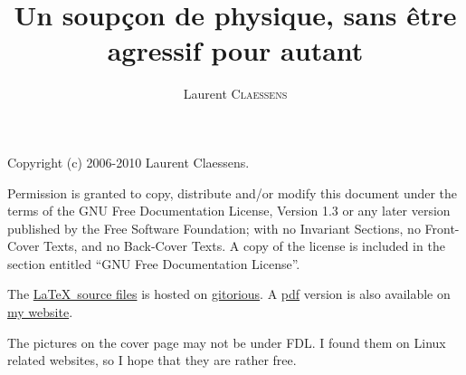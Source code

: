 
\thispagestyle{empty}
\title{Un soupçon de physique, sans être agressif pour autant}
\author{Laurent \textsc{Claessens}}
\maketitle

Copyright (c) 2006-2010  Laurent Claessens.

Permission is granted to copy, distribute and/or modify this document under the terms of the GNU Free Documentation License, Version 1.3 or any later version published by the Free Software Foundation; with no Invariant Sections, no Front-Cover Texts, and no Back-Cover Texts. A copy of the license is included in the section entitled ``GNU Free Documentation License''.

The \href{http://gitorious.org/echa}{\LaTeX\ source files} is hosted on \href{http://fr.wikipedia.org/wiki/Git}{gitorious}. A \href{http://student.ulb.ac.be/~lclaesse/echa.pdf}{pdf} version is also available on \href{http://student.ulb.ac.be/~lclaesse/}{my website}.

\vspace{0.5cm}
The pictures on the cover page may not be under FDL. I found them on Linux related websites, so I hope that they are rather free.



